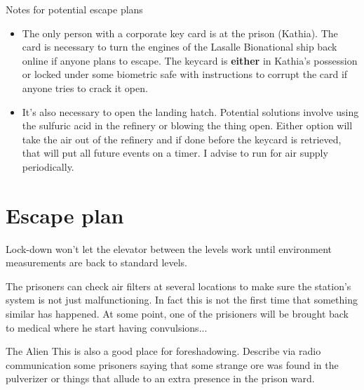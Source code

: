 \medskip
\begin{rpg-commentbox}{Notes for potential escape plans}
\begin{itemize}
    \item The only person with a corporate key card is at the prison (Kathia). The card is necessary to turn the engines of the Lasalle Bionational ship back online if anyone plans to escape. The keycard is \textbf{either} in Kathia's possession or locked under some biometric safe with instructions to corrupt the card if anyone tries to crack it open. 

    \item It's also necessary to open the landing hatch. Potential solutions involve using the sulfuric acid in the refinery or blowing the thing open. Either option will take the air out of the refinery and if done before the keycard is retrieved, that will put all future events on a timer. I advise to run for air supply periodically.
\end{itemize}
\end{rpg-commentbox}



    


\newsect

\newpage

\section{Escape plan}


\begin{rpg-commentbox}{}
    Lock-down won't let the elevator between the levels work until environment measurements are back to standard levels.
    
    
    The prisoners can check air filters at several locations to make sure the station's system is not just malfunctioning. In fact this is not the first time that something similar has happened. At some point, one of the prisioners will be brought back to medical where he start having convulsions...

\end{rpg-commentbox}

\begin{rpg-commentbox}{The Alien}
    This is also a good place for foreshadowing. Describe via radio communication some prisoners saying that some strange ore was found in the pulverizer or things that allude to an extra presence in the prison ward.
 \end{rpg-commentbox}




